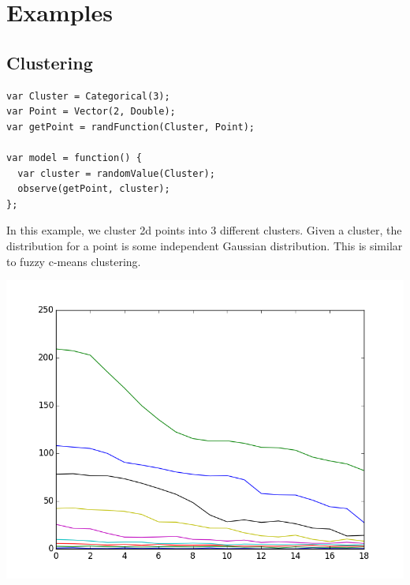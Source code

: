 \documentclass{article}
\begin{document}
  \section{Examples}

  \subsection{Clustering}
{\small
\begin{lstlisting}
var Cluster = Categorical(3);
var Point = Vector(2, Double);
var getPoint = randFunction(Cluster, Point);

var model = function() {
  var cluster = randomValue(Cluster);
  observe(getPoint, cluster);
};
\end{lstlisting}
}

In this example, we cluster 2d points into 3 different clusters.  Given a cluster, the distribution for a point is some independent Gaussian distribution.  This is similar to fuzzy c-means clustering.

\begin{center}
  \includegraphics[scale=0.5]{../plots/accuracy_nd_clustering.png}
\end{center}

% 
\end{document}
